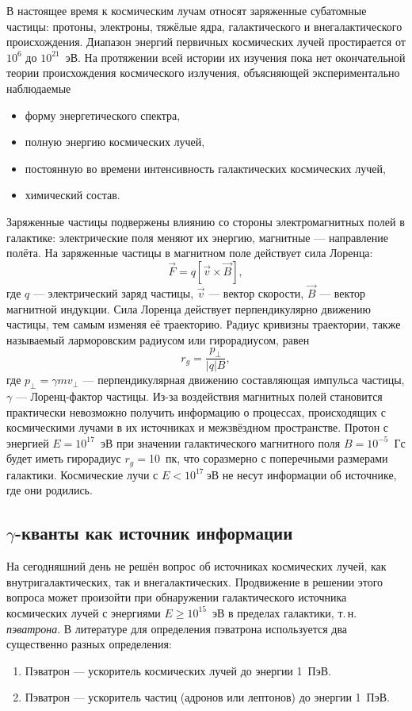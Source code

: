 \documentclass[magd,floatypics,numeref]{msudipl} %
\begin{document}
В настоящее время к космическим лучам относят заряженные субатомные частицы: протоны, электроны, тяжёлые ядра, галактического и внегалактического происхождения. Диапазон энергий первичных космических лучей простирается от $10^6$ до $10^{21}$~эВ. На протяжении всей истории их изучения пока нет окончательной теории происхождения космического излучения, объясняющей экспериментально наблюдаемые
\begin{itemize}
\item форму энергетического спектра,
\item полную энергию космических лучей,
\item постоянную во времени интенсивность галактических космических лучей,
\item химический состав.
\end{itemize}

Заряженные частицы подвержены влиянию со стороны электромагнитных полей в галактике: электрические поля меняют их энергию, магнитные --- направление полёта. На заряженные частицы в магнитном поле действует сила Лоренца:
\begin{equation}
\vec F = q\left[\vec v\times \vec B\right],
\end{equation}
где $q$ --- электрический заряд частицы, $\vec v$ --- вектор скорости, $\vec B$ --- вектор магнитной индукции. Сила Лоренца действует перпендикулярно движению частицы, тем самым изменяя её траекторию. Радиус кривизны траектории, также называемый ларморовским радиусом или гирорадиусом, равен
\begin{equation}
r_g = \frac{p_{\bot}}{|q|B},
\end{equation}
где $p_{\bot}=\gamma m v_{\bot}$ --- перпендикулярная движению составляющая импульса частицы, $\gamma$ --- Лоренц-фактор частицы. Из-за воздействия магнитных полей становится практически невозможно получить информацию о процессах, происходящих с космическими лучами в их источниках и межзвёздном пространстве. Протон с энергией $E=10^{17}$~эВ при значении галактического магнитного поля $B=10^{-5}$~Гс будет иметь гирорадиус $r_g=$10~пк, что соразмерно с поперечными размерами галактики. Космические лучи с $E<10^{17}~$эВ не несут информации об источнике, где они родились. 
\subsection{$\gamma$-кванты как источник информации}
На сегодняшний день не решён вопрос  об источниках космических лучей, как внутригалактических, так и внегалактических. Продвижение в решении этого вопроса может произойти при обнаружении галактического источника космических лучей с энергиями $E\geq10^{15}$~эВ в пределах галактики, т.\,н. \textit{пэватрона}. В литературе для определения пэватрона используется два существенно разных определения:
\begin{enumerate}
\item Пэватрон --- ускоритель космических лучей до энергии 1~ПэВ.
\item Пэватрон --- ускоритель частиц (адронов или лептонов) до энергии 1~ПэВ.
\end{enumerate}
\end{document}
